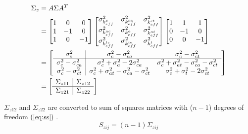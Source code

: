 \begin{equation}
  \label{eq:cov-z}
  \begin{split}
    \Sigma_{z} & = A \Sigma A^{T} \\
    & =
    \left[
    \begin{matrix}
      1 &  0 &  0 \\
      1 & -1 &  0 \\
      1 &  0 & -1
    \end{matrix}
    \right]
    \left[
    \begin{matrix}
      \sigma_{k_{eff}^{c}}^{2} & \sigma_{k_{eff}^{ca}}^{2} & \sigma_{k_{eff}^{ct}}^{2} \\
      \sigma_{k_{eff}^{ac}}^{2} & \sigma_{k_{eff}^{a}}^{2} & \sigma_{k_{eff}^{at}}^{2} \\
      \sigma_{k_{eff}^{tc}}^{2} & \sigma_{k_{eff}^{ta}}^{2} & \sigma_{k_{eff}^{t}}^{2}
    \end{matrix}
    \right]
    \left[
    \begin{matrix}
      1 &  1 &  1 \\
      0 & -1 &  0 \\
      0 &  0 & -1
    \end{matrix}
    \right] \\
    & =
    \left[
    \begin{array}{c|c c}
      \sigma_{c}^{2} & \sigma_{c}^{2} - \sigma_{ca}^{2} & \sigma_{c}^{2} - \sigma_{ct}^{2} \\
      \hline
      \sigma_{c}^{2} - \sigma_{ca}^{2} & \sigma_{c}^{2} + \sigma_{a}^{2} - 2\sigma_{ca}^{2} & \sigma_{c}^{2} + \sigma_{at}^{2} - \sigma_{ca}^{2} - \sigma_{ct}^{2} \\
      \sigma_{c}^{2} - \sigma_{ct}^{2} & \sigma_{c}^{2} + \sigma_{at}^{2} - \sigma_{ca}^{2} - \sigma_{ct}^{2} & \sigma_{c}^{2} + \sigma_{t}^{2} - 2\sigma_{ct}^{2}
    \end{array}
    \right] \\
    & =
    \left[
    \begin{array}{c|c}
      \Sigma_{z11} & \Sigma_{z12} \\
      \hline
      \Sigma_{z21} & \Sigma_{z22}
    \end{array}
    \right]
  \end{split}
\end{equation}

\noindent $\Sigma_{z12}$ and $\Sigma_{z22}$ are converted to sum of squares matrices with ($n - 1$) degrees of freedom (\ref{eq:ss}) \cite{urbatsch}.
%
\begin{equation}
  \label{eq:ss}
  S_{zij} = (n - 1) \Sigma_{zij}
\end{equation}

